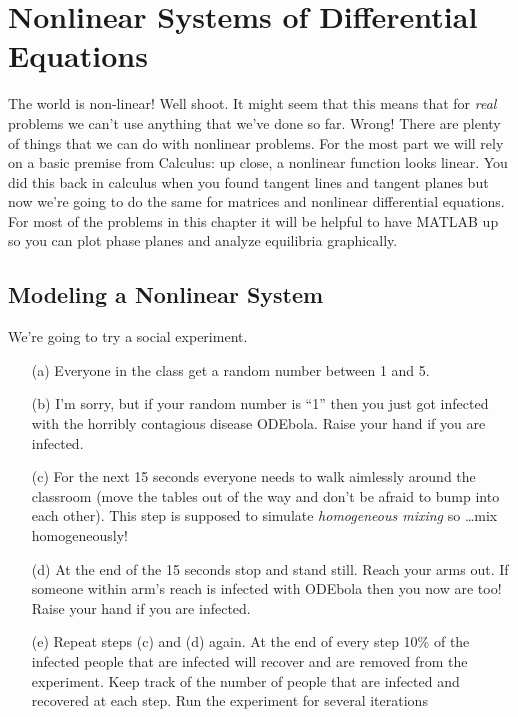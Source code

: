 \chapter{Nonlinear Systems of Differential Equations}
The world is non-linear!  Well shoot. It might seem that this means that for {\it real}
problems we can't use anything that we've done so far.   Wrong!  There are plenty of
things that we can do with nonlinear problems.  For the most part we will rely on a basic
premise from Calculus: up close, a nonlinear function looks linear. You did this back in
calculus when you found tangent lines and tangent planes but now we're going to do the
same for matrices and nonlinear differential equations.  For most of the problems in this
chapter it will be helpful to have MATLAB up so you can plot phase planes and analyze
equilibria graphically.

\section{Modeling a Nonlinear System}
\begin{problem}
    We're going to try a social experiment.  
    \begin{enumerate}
        \item[(a)] Everyone in the class get a random number between 1 and 5. 
        \item[(b)] I'm sorry, but if your random number is ``1'' then you just got infected
            with the horribly contagious disease ODEbola.  Raise your hand if you are
            infected.
        \item[(c)] For the next 15 seconds everyone needs to walk aimlessly around the
            classroom (move the tables out of the way and don't be afraid to bump into
            each other).  This step is supposed to simulate {\it homogeneous mixing} so
            \ldots mix homogeneously!
        \item[(d)] At the end of the 15 seconds stop and stand still.  Reach your arms
            out.  If someone within arm's reach is infected with ODEbola then you now are
            too!  Raise your hand if you are infected.
        \item[(e)] Repeat steps (c) and (d) again. At the end of every step 10\% of the
            infected people that are infected will recover and are removed from the
            experiment.  Keep track of the number of
            people that are infected and recovered at each step.  Run the experiment for
            several iterations
    \end{enumerate}
\end{problem}

